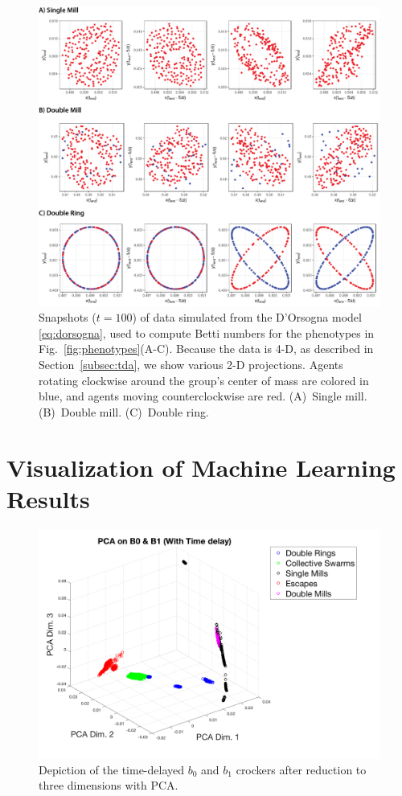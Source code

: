 \documentclass[%
 aip,
reprint,
 amsmath,amssymb,
 aps,
showkeys
]{revtex4-1}
\begin{document}
\begin{figure}
    \includegraphics[width=\textwidth]{Fig2_Supplement.png}
    \caption{Snapshots ($t=100$) of data simulated from the D'Orsogna model \eqref{eq:dorsogna}, used to compute Betti numbers for the phenotypes in Fig.~\ref{fig:phenotypes}(A-C). Because the data is 4-D, as described in Section~\ref{subsec:tda}, we show various 2-D projections. Agents rotating clockwise around the group's center of mass are colored in blue, and agents moving counterclockwise are red. (A)~Single mill. (B)~Double mill. (C)~Double ring.}
    \label{fig:4D_visual}
\end{figure}

\section{Visualization of Machine Learning Results}
\label{app:MLresults}

\begin{figure}
    \centering
    \includegraphics[width=.5\textwidth]{B0andB1_PCA.png}
    \caption{Depiction of the time-delayed $b_0$ and $b_1$ crockers after reduction to three dimensions with PCA.}
    \label{fig:PCA_depiction}
\end{figure}
\end{document}
